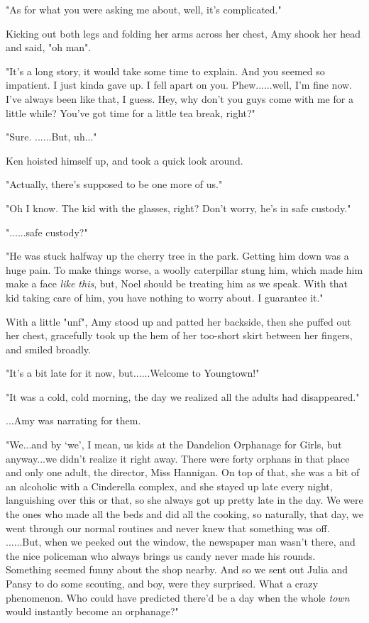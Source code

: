 \documentclass[
]{article}
\begin{document}
"As for what you were asking me about, well, it's complicated."

Kicking out both legs and folding her arms across her chest, Amy shook
her head and said, "oh man".

"It's a long story, it would take some time to explain. And you seemed
so impatient. I just kinda gave up. I fell apart on you. Phew......well,
I'm fine now. I've always been like that, I guess. Hey, why don't you
guys come with me for a little while? You've got time for a little tea
break, right?"

"Sure. ......But, uh..."

Ken hoisted himself up, and took a quick look around.

"Actually, there's supposed to be one more of us."

"Oh I know. The kid with the glasses, right? Don't worry, he's in safe
custody."

"......safe custody?"

"He was stuck halfway up the cherry tree in the park. Getting him down
was a huge pain. To make things worse, a woolly caterpillar stung him,
which made him make a face \emph{like this}, but, Noel should be
treating him as we speak. With that kid taking care of him, you have
nothing to worry about. I guarantee it."

With a little "unf", Amy stood up and patted her backside, then she
puffed out her chest, gracefully took up the hem of her too-short skirt
between her fingers, and smiled broadly.

"It's a bit late for it now, but......Welcome to Youngtown!"

"It was a cold, cold morning, the day we realized all the adults had
disappeared."

...Amy was narrating for them.

"We...and by `we', I mean, us kids at the Dandelion Orphanage for Girls,
but anyway...we didn't realize it right away. There were forty orphans
in that place and only one adult, the director, Miss Hannigan. On top of
that, she was a bit of an alcoholic with a Cinderella complex, and she
stayed up late every night, languishing over this or that, so she always
got up pretty late in the day. We were the ones who made all the beds
and did all the cooking, so naturally, that day, we went through our
normal routines and never knew that something was off. ......But, when
we peeked out the window, the newspaper man wasn't there, and the nice
policeman who always brings us candy never made his rounds. Something
seemed funny about the shop nearby. And so we sent out Julia and Pansy
to do some scouting, and boy, were they surprised. What a crazy
phenomenon. Who could have predicted there'd be a day when the whole
\emph{town} would instantly become an orphanage?"
\end{document}
